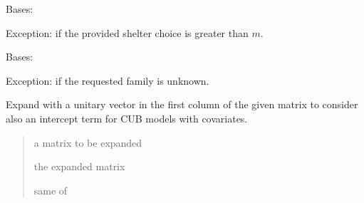 \documentclass[letterpaper,10pt,english]{sphinxmanual}
\begin{document}
\begin{fulllineitems}
\label{\detokenize{cubmods:cubmods.general.ShelterGreaterThanM}}
\pysigstartsignatures
{}
\pysigstopsignatures
\sphinxAtStartPar
Bases: 

\sphinxAtStartPar
Exception: if the provided shelter choice is greater than \(m\).

\end{fulllineitems}


\begin{fulllineitems}
\label{\detokenize{cubmods:cubmods.general.UnknownModelError}}
\pysigstartsignatures
{}
\pysigstopsignatures
\sphinxAtStartPar
Bases: 

\sphinxAtStartPar
Exception: if the requested family is unknown.

\end{fulllineitems}


\begin{fulllineitems}
\label{\detokenize{cubmods:cubmods.general.addones}}
\pysigstartsignatures
{}
\pysigstopsignatures
\sphinxAtStartPar
Expand with a unitary vector in the first column of the given matrix
to consider also an intercept term for CUB models with covariates.
\begin{quote}\begin{description}
\sphinxAtStartPar
{} \textendash{} a matrix to be expanded

\sphinxAtStartPar
the expanded matrix

\sphinxAtStartPar
same of 

\end{description}\end{quote}

\end{fulllineitems}
\end{document}
